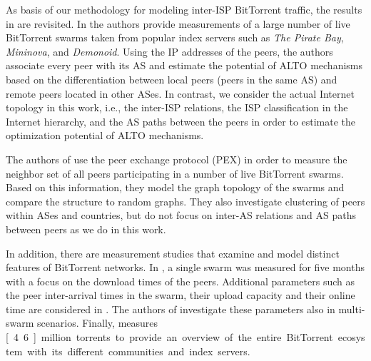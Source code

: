 As basis of our methodology for modeling inter-ISP BitTorrent traffic, the results in \cite{Hossfeld2011} are revisited. In \cite{Hossfeld2011} the authors provide measurements of a large number of live BitTorrent swarms taken from popular index servers such as \emph{The Pirate Bay}, \emph{Mininova}, and \emph{Demonoid}. Using the IP addresses of the peers, the authors associate every peer with its AS and estimate the potential of ALTO mechanisms based on the differentiation between local peers (peers in the same AS) and remote peers located in other ASes. In contrast, we consider the actual Internet topology in this work, i.e., the inter-ISP relations, the ISP classification in the Internet hierarchy, and the AS paths between the peers in order to estimate the optimization potential of ALTO mechanisms.

The authors of \cite{Kryczka2011} use the peer exchange protocol (PEX) in order to measure the neighbor set of all peers participating in a number of live BitTorrent swarms. Based on this information, they model the graph topology of the swarms and compare the structure to random graphs. They also investigate clustering of peers within ASes and countries, but do not focus on inter-AS relations and AS paths between peers as we do in this work.

In addition, there are measurement studies that examine and model distinct features of BitTorrent networks. In \cite{Izal2004}, a single swarm was measured for five months with a focus on the download times of the peers. Additional parameters such as the peer inter-arrival times in the swarm, their upload capacity and their online time are considered in \cite{Pouwelse2005}. The authors of \cite{Guo2005} investigate these parameters also in multi-swarm scenarios. Finally, \cite{Zhang2010} measures \unit[4.6]{million} torrents to provide an overview of the entire BitTorrent ecosystem with its different communities and index servers.

